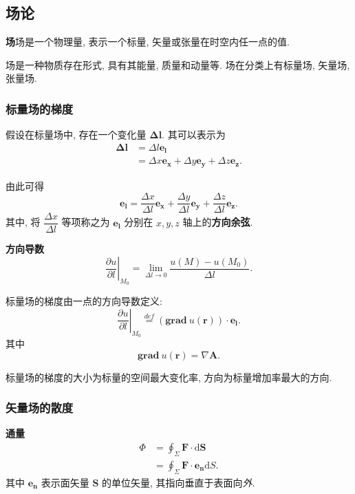 \subsection{场论}

\textbf{场}\quad 场是一个物理量, 表示一个标量, 矢量或张量在时空内任一点的值.

场是一种物质存在形式, 具有其能量, 质量和动量等. 场在分类上有标量场, 矢量场, 张量场.

\subsubsection{标量场的梯度}
假设在标量场中, 存在一个变化量 $\bm{\Delta l}$. 其可以表示为
\begin{equation}
    \begin{aligned}
        \bm{\Delta l} & =\Delta l\bm{e_l}                                    \\
                      & =\Delta x\bm{e_x}+\Delta y\bm{e_y}+\Delta z\bm{e_z}.
    \end{aligned}
\end{equation}

由此可得
\begin{equation}
    \bm{e_l}=\frac{\Delta x}{\Delta l}\bm{e_x}+\frac{\Delta y}{\Delta l}\bm{e_y}+\frac{\Delta z}{\Delta l}\bm{e_z}.
\end{equation}
其中, 将 $\dfrac{\Delta x}{\Delta l}$ 等项称之为 $\bm{e_l}$ 分别在 $x,y,z$ 轴上的\textbf{方向余弦}.

\textbf{方向导数}
\begin{equation}
    \left.\frac{\partial u}{\partial l}\right|_{M_0}=\lim_{\Delta l\rightarrow 0}\frac{u(M)-u(M_0)}{\Delta l}.
\end{equation}

标量场的梯度由一点的方向导数定义:
\begin{equation}
    \left.\frac{\partial u}{\partial l}\right|_{M_0}\stackrel{def}{=}(\textbf{grad}\ u(\bm{r}))\cdot\bm{e_l}.
\end{equation}
其中
\begin{equation}
    \textbf{grad}\ u(\bm{r})=\nabla\bm{A}.
\end{equation}

标量场的梯度的大小为标量的空间最大变化率, 方向为标量增加率最大的方向.

\subsubsection{矢量场的散度}
\textbf{通量}
\begin{equation}
    \begin{aligned}
        \Phi & =\oint_{\Sigma}\bm{F}\cdot\mathrm{d}\bm{S}     \\
             & =\oint_{\Sigma}\bm{F}\cdot\bm{e_n}\mathrm{d}S.
    \end{aligned}
\end{equation}
其中 $\bm{e_n}$ 表示面矢量 $\bm{S}$ 的单位矢量, 其指向垂直于表面向\textit{外}.

